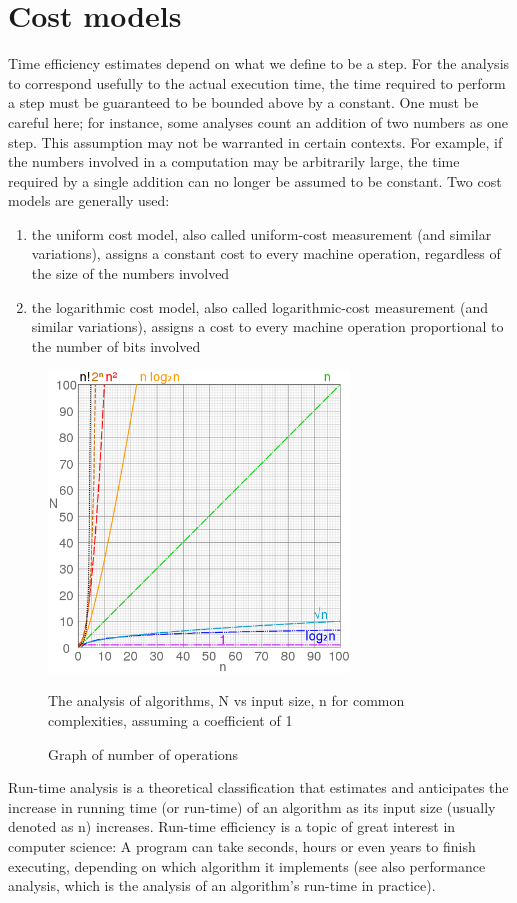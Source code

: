 \documentclass[openany,a4paper,12pt]{book}
\begin{document}
\section{Cost models}
Time efficiency estimates depend on what we define to be a step. For the analysis to correspond usefully to the actual execution time, the time required to perform a step must be guaranteed to be bounded above by a constant. One must be careful here; for instance, some analyses count an addition of two numbers as one step. This assumption may not be warranted in certain contexts. For example, if the numbers involved in a computation may be arbitrarily large, the time required by a single addition can no longer be assumed to be constant.
\newline \newline
Two cost models are generally used:
\begin{enumerate}
\item 
the uniform cost model, also called uniform-cost measurement (and similar variations), assigns a constant cost to every machine operation, regardless of the size of the numbers involved
\item
the logarithmic cost model, also called logarithmic-cost measurement (and similar variations), assigns a cost to every machine operation proportional to the number of bits involved \cite{Abedon94:5}
\end{enumerate}
\begin{center}

\begin{figure}[ht]
\begin{center}
\includegraphics[width=8cm]{picture2.png} \caption{Graph of number of operations}{The analysis of algorithms, N vs input size, n for common complexities, assuming a coefficient of 1} \label{rys2}
\end{center}
\end{figure}
\end{center}
Run-time analysis is a theoretical classification that estimates and anticipates the increase in running time (or run-time) of an algorithm as its input size (usually denoted as n) increases. Run-time efficiency is a topic of great interest in computer science: A program can take seconds, hours or even years to finish executing, depending on which algorithm it implements (see also performance analysis, which is the analysis of an algorithm's run-time in practice).\cite{goossens93:3}
\end{document}
